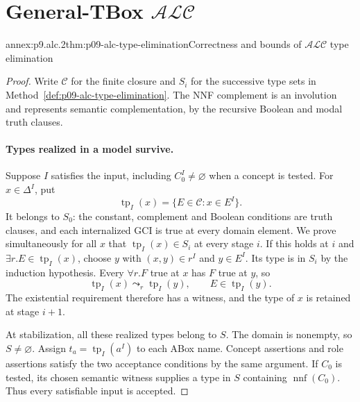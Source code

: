 
\section{General-TBox \(\mathcal{ALC}\)}

\begin{annexitem}{annex:p9.alc.2}{thm:p09-alc-type-elimination}{Correctness and bounds of \(\mathcal{ALC}\) type elimination}
\begin{proof}
Write \(\mathcal C\) for the finite closure and \(S_i\) for the
successive type sets in Method~\ref{def:p09-alc-type-elimination}.
The NNF complement is an involution and represents semantic
complementation, by the recursive Boolean and modal truth clauses.

\paragraph{Types realized in a model survive.}
Suppose \(I\) satisfies the input, including \(C_0^I\ne\varnothing\)
when a concept is tested.
For \(x\in\Delta^I\), put
\[
 \operatorname{tp}_I(x)=\{E\in\mathcal C:x\in E^I\}.
\]
It belongs to \(S_0\): the constant, complement and Boolean conditions
are truth clauses, and each internalized GCI is true at every
domain element.
We prove simultaneously for all \(x\) that
\(\operatorname{tp}_I(x)\in S_i\) at every stage \(i\).
If this holds at \(i\) and \(\exists r.E\in\operatorname{tp}_I(x)\),
choose \(y\) with \((x,y)\in r^I\) and \(y\in E^I\).
Its type is in \(S_i\) by the induction hypothesis.
Every \(\forall r.F\) true at \(x\) has \(F\) true at \(y\),
so
\[
 \operatorname{tp}_I(x)\leadsto_r\operatorname{tp}_I(y),
 \qquad E\in\operatorname{tp}_I(y).
\]
The existential requirement therefore has a witness, and the type
of \(x\) is retained at stage \(i+1\).

At stabilization, all these realized types belong to \(S\).
The domain is nonempty, so \(S\ne\varnothing\).
Assign \(t_a=\operatorname{tp}_I(a^I)\) to each ABox name.
Concept assertions and role assertions satisfy the two acceptance
conditions by the same argument.
If \(C_0\) is tested, its chosen semantic witness supplies a type
in \(S\) containing \(\operatorname{nnf}(C_0)\).
Thus every satisfiable input is accepted.


\end{proof}
\end{annexitem}
